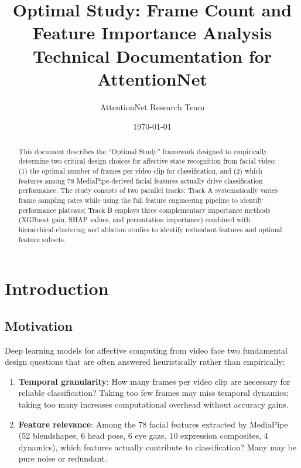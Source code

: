 \documentclass[11pt,a4paper]{article}
\title{\textbf{Optimal Study: Frame Count and Feature Importance Analysis}\\\large Technical Documentation for AttentionNet}
\author{AttentionNet Research Team}
\date{\today}
\begin{document}
\maketitle

\begin{abstract}
  \noindent
  This document describes the ``Optimal Study'' framework designed to empirically determine two critical design choices for affective state recognition from facial video: (1) the optimal number of frames per video clip for classification, and (2) which features among 78 MediaPipe-derived facial features actually drive classification performance. The study consists of two parallel tracks: Track A systematically varies frame sampling rates while using the full feature engineering pipeline to identify performance plateaus; Track B employs three complementary importance methods (XGBoost gain, SHAP values, and permutation importance) combined with hierarchical clustering and ablation studies to identify redundant features and optimal feature subsets.
\end{abstract}

\section{Introduction}\label{sec:introduction}

\subsection{Motivation}

Deep learning models for affective computing from video face two fundamental design questions that are often answered heuristically rather than empirically:

\begin{enumerate}
  \item \textbf{Temporal granularity}: How many frames per video clip are necessary for reliable classification? Taking too few frames may miss temporal dynamics; taking too many increases computational overhead without accuracy gains.

  \item \textbf{Feature relevance}: Among the 78 facial features extracted by MediaPipe (52 blendshapes, 6 head pose, 6 eye gaze, 10 expression composites, 4 dynamics), which features actually contribute to classification? Many may be pure noise or redundant.
\end{enumerate}
\end{document}
